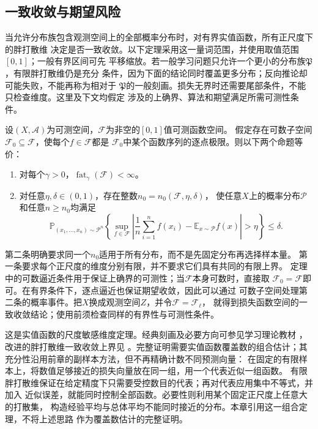 \subsection{一致收敛与期望风险}

当允许分布族包含观测空间上的全部概率分布时，对有界实值函数，所有正尺度下的胖打散维
决定是否一致收敛。以下定理采用这一量词范围，并使用取值范围$[0,1]$；一般有界区间可先
平移缩放。若一般学习问题只允许一个更小的分布族$\mathfrak P$，有限胖打散维仍是充分
条件，因为下面的结论同时覆盖更多分布；反向推论却可能失败，不能再称为相对于
$\mathfrak P$的一般刻画。损失无界时还需要尾部条件，不能只检查维度。这里及下文均假定
涉及的上确界、算法和期望满足所需可测性条件。

\begin{theorem}[胖打散维与一致收敛]
\label{thm:fat-uniform-convergence}
设$(X,\mathcal A)$为可测空间，$\mathcal F$为非空的$[0,1]$值可测函数空间。
假定存在可数子空间$\mathcal F_0\subseteq\mathcal F$，使每个$f\in\mathcal F$都是
$\mathcal F_0$中某个函数序列的逐点极限。则以下两个命题等价：
\begin{enumerate}
 \item 对每个$\gamma>0$，$\operatorname{fat}_{\gamma}(\mathcal F)<\infty$。
 \item 对任意$\eta,\delta\in(0,1)$，存在整数$n_0=n_0(\mathcal F,\eta,\delta)$，
 使任意$X$上的概率分布$\mathcal P$和任意$n\geq n_0$均满足
 \[
 \mathbb P_{(x_1,\ldots,x_n)\sim\mathcal P^n}\!\left\{
 \sup_{f\in\mathcal F}
 \left|\frac1n\sum_{i=1}^n f(x_i)-\mathbb E_{x\sim\mathcal P}f(x)\right|
 >\eta\right\}\leq\delta.
 \]
\end{enumerate}
\end{theorem}

第二条明确要求同一个$n_0$适用于所有分布，而不是先固定分布再选择样本量。
第一条要求每个正尺度的维度分别有限，并不要求它们具有共同的有限上界。
定理中的可数逼近条件用于保证上确界的可测性；当$\mathcal F$本身可数时，直接取
$\mathcal F_0=\mathcal F$即可。在有界条件下，逐点逼近也保证期望收敛，因此可以通过
可数子空间处理第二条的概率事件。把$X$换成观测空间$Z$，并令$\mathcal F=\mathcal F_\ell$，
就得到损失函数空间的一致收敛结论；使用前须检查同样的有界性与可测性条件。

这是实值函数的尺度敏感维度定理。经典刻画及必要方向可参见学习理论教材
，改进的胖打散维一致收敛上界见
。完整证明需要实值函数覆盖数的组合估计；其充分性沿用前章的副样本方法，但不再精确计数不同预测向量：
在固定的有限样本上，将数值足够接近的损失向量放在同一组，用一个代表近似一组函数。
有限胖打散维保证在给定精度下只需要受控数目的代表；再对代表应用集中不等式，并加入
近似误差，就能同时控制全部函数。必要性则利用某个固定正尺度上任意大的打散集，
构造经验平均与总体平均不能同时接近的分布。本章引用这一组合定理，不将上述思路
作为覆盖数估计的完整证明。

